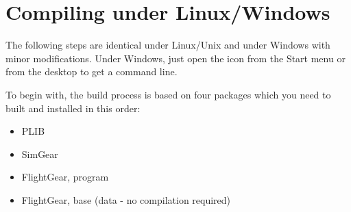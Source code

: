 \section{Compiling \FlightGear{} under Linux/Windows\label{compilinglinwin} }

The following steps are identical under Linux/Unix and under Windows with minor
modifications. Under Windows, just open the \Cygwin{} icon from the Start menu or from
the desktop to get a command line.

To begin with, the \FlightGear{} build process is based on four packages which you need to built and installed in this order:

\begin{itemize}
\item PLIB
\item SimGear
\item FlightGear, program
\item FlightGear, base (data - no compilation required)
\end{itemize}

